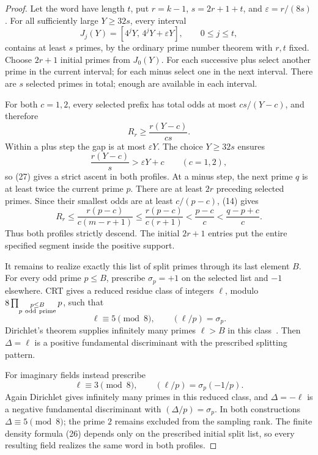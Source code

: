 \documentclass[11pt]{article}
\begin{document}
\begin{proof}
Let the word have length \(t\), put \(r=k-1\), \(s=2r+1+t\),
and \(\varepsilon=r/(8s)\). For all sufficiently large \(Y\geq32s\),
every interval
\[
 J_j(Y)=[4^jY,\,4^jY+\varepsilon Y],
                   \qquad 0\leq j\leq t,
\]
contains at least \(s\) primes, by the ordinary prime number theorem
with \(r,t\) fixed. Choose \(2r+1\) initial primes from \(J_0(Y)\).
For each successive plus select another prime in the current interval;
for each minus select one in the next interval. There are \(s\)
selected primes in total; enough are available in each interval.

For both \(c=1,2\), every selected prefix has total odds at most
\(cs/(Y-c)\), and therefore
\[
 R_r\geq\frac{r(Y-c)}{cs}.
\]
Within a plus step the gap is at most \(\varepsilon Y\).
The choice \(Y\geq32s\) ensures
\[
 \frac{r(Y-c)}s>\varepsilon Y+c \qquad(c=1,2),
\]
so (27) gives a strict ascent in both profiles. At a minus step,
the next prime \(q\) is at least twice the current prime \(p\).
There are at least \(2r\) preceding selected primes. Since their
smallest odds are at least \(c/(p-c)\), (14) gives
\[
 R_r\leq\frac{r(p-c)}{c(m-r+1)}
       \leq\frac{r(p-c)}{c(r+1)}
       <\frac{p-c}{c}<\frac{q-p+c}{c}.
\]
Thus both profiles strictly descend. The initial \(2r+1\) entries
put the entire specified segment inside the positive support.

It remains to realize exactly this list of split primes through its
last element \(B\). For every odd prime \(p\leq B\), prescribe
\(\sigma_p=+1\) on the selected list and \(-1\) elsewhere.
CRT gives a reduced residue class of integers \(\ell\), modulo
\(8\prod_{\substack{p\leq B\\p\ {\rm odd\ prime}}}p\), such that
\[
 \ell\equiv5\pmod8,\qquad (\ell/p)=\sigma_p .
\]
Dirichlet's theorem supplies infinitely many primes \(\ell>B\)
in this class~\cite{Sutherland}. Then \(\Delta=\ell\) is a positive
fundamental discriminant with the prescribed splitting pattern.

For imaginary fields instead prescribe
\[
 \ell\equiv3\pmod8,\qquad
       (\ell/p)=\sigma_p(-1/p).
\]
Again Dirichlet gives infinitely many primes in this reduced class,
and \(\Delta=-\ell\) is a negative fundamental discriminant with
\((\Delta/p)=\sigma_p\). In both constructions \(\Delta\equiv5\pmod8\);
the prime \(2\) remains excluded from the sampling rank. The finite
density formula (26) depends only on the prescribed initial split list,
so every resulting field realizes the same word in both profiles.


\end{proof}
\end{document}
